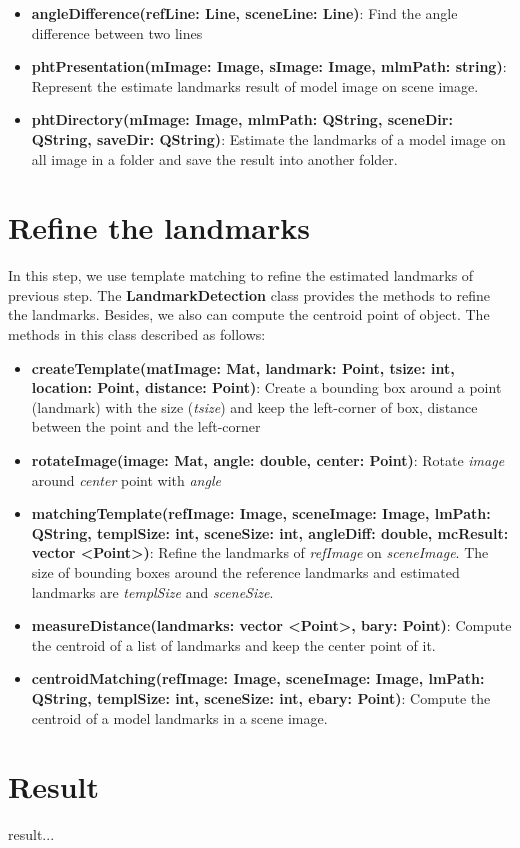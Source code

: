 \begin{itemize}
\item\textbf{angleDifference(refLine: Line, sceneLine: Line)}: Find the angle difference between two lines
\item\textbf{phtPresentation(mImage: Image, sImage: Image, mlmPath: string)}: Represent the estimate landmarks result of model image on scene image.
\item\textbf{phtDirectory(mImage: Image, mlmPath: QString, sceneDir: QString, saveDir: QString)}: Estimate the landmarks of a model image on all image in a folder and save the result into another folder.
\end{itemize}
\section{Refine the landmarks}
In this step, we use template matching to refine the estimated landmarks of previous step. The \textbf{LandmarkDetection} class provides the methods to refine the landmarks. Besides, we also can compute the centroid point of object. The methods in this class described as follows:
\begin{itemize}
\item\textbf{createTemplate(matImage: Mat, landmark: Point, tsize: int, location: Point, distance: Point)}: Create a bounding box around a point (landmark) with the size (\textit{tsize}) and keep the left-corner of box, distance between the point and the left-corner
\item\textbf{rotateImage(image: Mat, angle: double, center: Point)}: Rotate \textit{image} around \textit{center} point with \textit{angle}
\item\textbf{matchingTemplate(refImage: Image, sceneImage: Image, lmPath: QString, templSize: int, sceneSize: int, angleDiff: double, mcResult: vector \textless Point\textgreater)}: Refine the landmarks of \textit{refImage} on \textit{sceneImage}. The size of bounding boxes around the reference landmarks and estimated landmarks are \textit{templSize} and \textit{sceneSize}.
\item\textbf{measureDistance(landmarks: vector \textless Point\textgreater, bary: Point)}: Compute the centroid of a list of landmarks and keep the center point of it.
\item\textbf{centroidMatching(refImage: Image, sceneImage: Image, lmPath: QString, templSize: int, sceneSize: int, ebary: Point)}: Compute the centroid of a model landmarks in a scene image.
\end{itemize}
\section{Result}
result...


